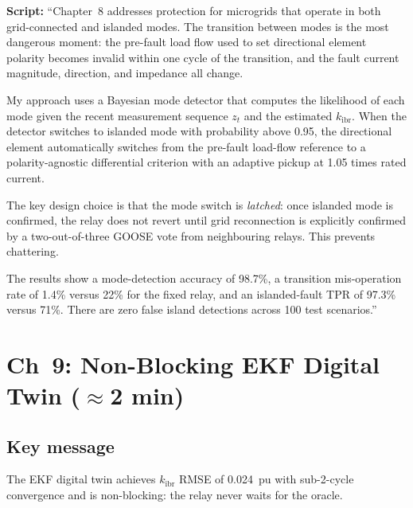 \documentclass[11pt,a4paper]{article}
\newcommand{\script}[1]{\begin{scriptbox}\textbf{Script:} #1\end{scriptbox}}
\newcommand{\kibr}{k_{\mathrm{ibr}}}
\begin{document}
\script{%
``Chapter~8 addresses protection for microgrids that operate in both grid-connected and
islanded modes. The transition between modes is the most dangerous moment: the pre-fault
load flow used to set directional element polarity becomes invalid within one cycle of
the transition, and the fault current magnitude, direction, and impedance all change.

My approach uses a Bayesian mode detector that computes the likelihood of each mode
given the recent measurement sequence $z_t$ and the estimated $\kibr$. When the detector
switches to islanded mode with probability above 0.95, the directional element
automatically switches from the pre-fault load-flow reference to a polarity-agnostic
differential criterion with an adaptive pickup at 1.05 times rated current.

The key design choice is that the mode switch is \emph{latched}: once islanded mode is
confirmed, the relay does not revert until grid reconnection is explicitly confirmed by
a two-out-of-three GOOSE vote from neighbouring relays. This prevents chattering.

The results show a mode-detection accuracy of 98.7\%, a transition mis-operation rate
of 1.4\% versus 22\% for the fixed relay, and an islanded-fault TPR of 97.3\% versus
71\%. There are zero false island detections across 100 test scenarios.''%
}

\section{Ch~9: Non-Blocking EKF Digital Twin \hfill\normalfont\small($\approx$2 min)}
\label{slide:ekf}

\subsection*{Key message}
The EKF digital twin achieves $\kibr$ RMSE of 0.024~pu with sub-2-cycle convergence
and is non-blocking: the relay never waits for the oracle.
\end{document}
